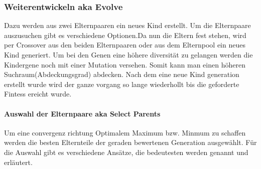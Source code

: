 \subsubsection{Weiterentwickeln aka Evolve}
Dazu werden aus zwei Elternpaaren ein neues Kind erstellt. Um die Elternpaare auszusuchen gibt es verschiedene Optionen.Da nun die Eltern fest stehen, wird per Crossover aus den beiden Elternpaaren oder aus dem Elternpool ein neues Kind generiert. Um bei den Genen eine höhere diversität zu gelangen werden die Kindergene noch mit einer Mutation versehen. Somit kann man einen höheren Suchraum(Abdeckungsgrad) abdecken. Nach dem eine neue Kind generation erstellt wurde wird der ganze vorgang so lange wiederhollt bis die geforderte Fintess ereicht wurde.

\paragraph{Auswahl der Elternpaare aka Select Parents}
Um eine convergenz richtung Optimalem Maximum bzw. Minmum zu schaffen werden die besten Elternteile der geraden bewertenen Generation ausgewählt.
Für die Auswahl gibt es verschiedene Ansätze, die bedeutesten werden genannt und erläutert.
